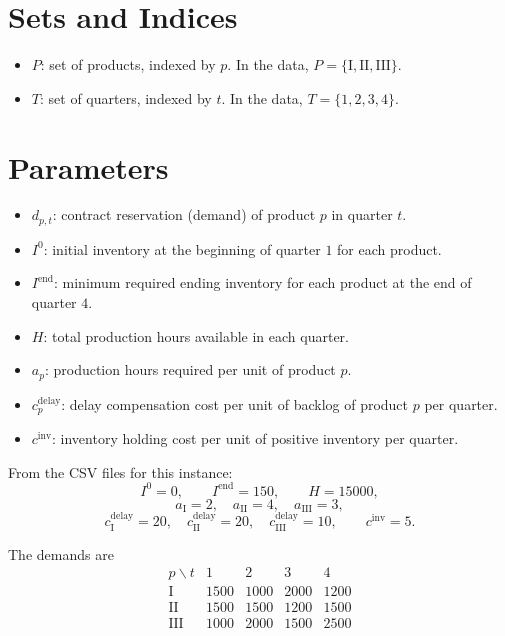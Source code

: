 \section*{Sets and Indices}

\begin{itemize}
    \item $P$: set of products, indexed by $p$. In the data, $P=\{\mathrm{I},\mathrm{II},\mathrm{III}\}$.
    \item $T$: set of quarters, indexed by $t$. In the data, $T=\{1,2,3,4\}$.
\end{itemize}

\section*{Parameters}

\begin{itemize}
    \item $d_{p,t}$: contract reservation (demand) of product $p$ in quarter $t$.
    \item $I^{0}$: initial inventory at the beginning of quarter $1$ for each product.
    \item $I^{\mathrm{end}}$: minimum required ending inventory for each product at the end of quarter $4$.
    \item $H$: total production hours available in each quarter.
    \item $a_p$: production hours required per unit of product $p$.
    \item $c^{\mathrm{delay}}_p$: delay compensation cost per unit of backlog of product $p$ per quarter.
    \item $c^{\mathrm{inv}}$: inventory holding cost per unit of positive inventory per quarter.
\end{itemize}

From the CSV files for this instance:
\[
I^{0}=0,\qquad I^{\mathrm{end}}=150,\qquad H=15000,
\]
\[
a_{\mathrm{I}}=2,\quad a_{\mathrm{II}}=4,\quad a_{\mathrm{III}}=3,
\]
\[
c^{\mathrm{delay}}_{\mathrm{I}}=20,\quad
c^{\mathrm{delay}}_{\mathrm{II}}=20,\quad
c^{\mathrm{delay}}_{\mathrm{III}}=10,
\qquad
c^{\mathrm{inv}}=5.
\]

The demands are
\[
\begin{array}{c|cccc}
p \backslash t & 1 & 2 & 3 & 4\\ \hline
\mathrm{I}   & 1500 & 1000 & 2000 & 1200\\
\mathrm{II}  & 1500 & 1500 & 1200 & 1500\\
\mathrm{III} & 1000 & 2000 & 1500 & 2500
\end{array}
\]

